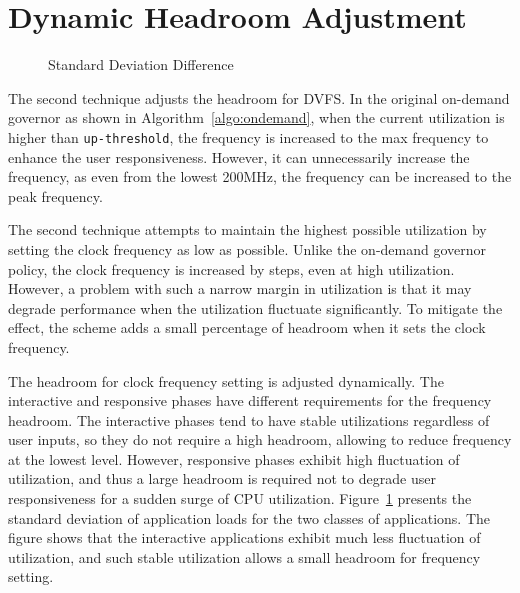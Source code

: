 

\section{Dynamic Headroom Adjustment}

\begin{figure}[bt]
\begin{center}
\vspace{-0.2in}
\end{center}
\caption{Standard Deviation Difference}
\label{fig:stdv_phase}
\end{figure}

The second technique adjusts the headroom for DVFS. In the original on-demand 
governor as shown in Algorithm~\ref{algo:ondemand}, when the current utilization is higher than
{\tt up-threshold}, the frequency is increased to the max frequency to enhance the user responsiveness.
However, it can unnecessarily increase the frequency, as even from the lowest 200MHz,
the frequency can be increased to the peak frequency.

The second technique attempts to maintain the highest possible utilization by
setting the clock frequency as low as possible. Unlike the on-demand governor 
policy, the clock frequency is increased by steps, even at high utilization.
However, a problem with such
a narrow margin in utilization is that it may degrade performance when the
utilization fluctuate significantly. To mitigate the effect, the scheme adds 
a small percentage of headroom when it sets the clock frequency.

The headroom for clock frequency setting is adjusted dynamically.
The interactive and responsive phases have different requirements for the 
frequency headroom. The interactive phases tend to have stable utilizations regardless
of user inputs, so they do not require a high headroom, allowing to reduce 
frequency at the lowest level. 
However, responsive phases exhibit high fluctuation of utilization,
and thus a large headroom is required not to degrade user responsiveness for a sudden surge
of CPU utilization. Figure~\ref{fig:stdv_phase} presents the standard deviation of
application loads for the two classes of applications. The figure shows that
the interactive applications exhibit much less fluctuation of utilization, and
such stable utilization allows a small headroom for frequency setting.

